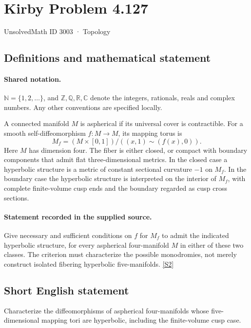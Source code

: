 \documentclass[11pt]{article}
\newcommand{\sref}[2]{\hyperlink{source:#1:#2}{[S#2]}}
\begin{document}
\setcounter{section}{3002}
\section{Kirby Problem 4.127}\label{3003}
{\small\sffamily UnsolvedMath ID 3003 · Topology}
\subsection{Definitions and mathematical statement}

\paragraph{Shared notation.}$\mathbb N=\{1,2,\ldots\}$, and $\mathbb Z,\mathbb Q,\mathbb R,\mathbb C$ denote the integers, rationals, reals and complex numbers. Any other conventions are specified locally.


A connected manifold $M$ is aspherical if its universal cover is contractible. For a smooth self-diffeomorphism $f:M\to M$, its mapping torus is
\[
 M_f=(M\times[0,1])/((x,1)\sim(f(x),0)).
\]
Here $M$ has dimension four. The fiber is either closed, or compact with boundary components that admit flat three-dimensional metrics. In the closed case a hyperbolic structure is a metric of constant sectional curvature $-1$ on $M_f$. In the boundary case the hyperbolic structure is interpreted on the interior of $M_f$, with complete finite-volume cusp ends and the boundary regarded as cusp cross sections.
\paragraph{Statement recorded in the supplied source.}
Give necessary and sufficient conditions on $f$ for $M_f$ to admit the indicated hyperbolic structure, for every aspherical four-manifold $M$ in either of these two classes. The criterion must characterize the possible monodromies, not merely construct isolated fibering hyperbolic five-manifolds. \sref{3003}{2}
\subsection{Short English statement}
Characterize the diffeomorphisms of aspherical four-manifolds whose five-dimensional mapping tori are hyperbolic, including the finite-volume cusp case.
\end{document}
